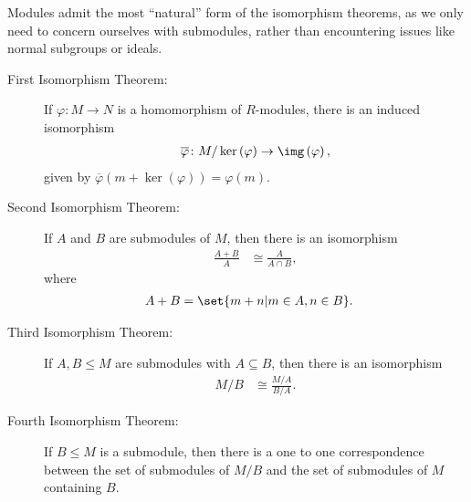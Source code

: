 \documentclass[10pt]{mypackage}
\begin{document}
Modules admit the most ``natural'' form of the isomorphism theorems, as we only need to concern ourselves with submodules, rather than encountering issues like normal subgroups or ideals.
\begin{theorem}\hfill
  \begin{description}
    \item[First Isomorphism Theorem:] If $\varphi\colon M\rightarrow N$ is a homomorphism of $R$-modules, there is an induced isomorphism
      \begin{align*}
        \overline{\varphi}\colon M/\ker\left( \varphi \right)\rightarrow \img\left( \varphi \right),
      \end{align*}
      given by $ \overline{\varphi}\left( m + \ker\left( \varphi \right) \right) = \varphi(m) $.
    \item[Second Isomorphism Theorem:] If $A$ and $B$ are submodules of $M$, then there is an isomorphism
      \begin{align*}
        \frac{A + B}{A} &\cong \frac{A}{A\cap B},
      \end{align*}
      where 
      \begin{align*}
        A + B &= \set{m + n | m\in A,n\in B}.
      \end{align*}
    \item[Third Isomorphism Theorem:] If $A,B\leq M$ are submodules with $A\subseteq B$, then there is an isomorphism
      \begin{align*}
        M/B &\cong \frac{M/A}{B/A}.
      \end{align*}
    \item[Fourth Isomorphism Theorem:] If $B\leq M$ is a submodule, then there is a one to one correspondence between the set of submodules of $M/B$ and the set of submodules of $M$ containing $B$.
  \end{description}
\end{theorem}
\end{document}
